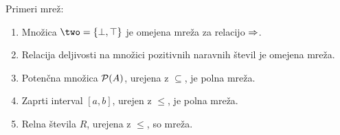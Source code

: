 \begin{primer}
  Primeri mrež:
  \begin{enumerate}
  \item Množica $\two = \set{\bot, \top}$ je omejena mreža za relacijo $\Rightarrow$.
  \item Relacija deljivosti na množici pozitivnih naravnih števil je omejena mreža.
  \item Potenčna množica $\mathcal{P}(A)$, urejena z $\subseteq$, je polna mreža.
  \item Zaprti interval $[a,b]$, urejen z $\leq$, je polna mreža.
  \item Relna števila $R$, urejena z $\leq$, so mreža.
  \end{enumerate}
\end{primer}
